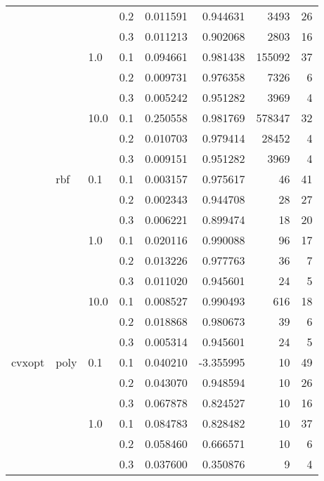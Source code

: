 \begin{table}[H]
\begin{tabular}{llllrrrr}
       &     &      & 0.2 &    0.011591 &  0.944631 &    3493 &    26 \\
       &     &      & 0.3 &    0.011213 &  0.902068 &    2803 &    16 \\
       &     & 1.0  & 0.1 &    0.094661 &  0.981438 &  155092 &    37 \\
       &     &      & 0.2 &    0.009731 &  0.976358 &    7326 &     6 \\
       &     &      & 0.3 &    0.005242 &  0.951282 &    3969 &     4 \\
       &     & 10.0 & 0.1 &    0.250558 &  0.981769 &  578347 &    32 \\
       &     &      & 0.2 &    0.010703 &  0.979414 &   28452 &     4 \\
       &     &      & 0.3 &    0.009151 &  0.951282 &    3969 &     4 \\
       & rbf & 0.1  & 0.1 &    0.003157 &  0.975617 &      46 &    41 \\
       &     &      & 0.2 &    0.002343 &  0.944708 &      28 &    27 \\
       &     &      & 0.3 &    0.006221 &  0.899474 &      18 &    20 \\
       &     & 1.0  & 0.1 &    0.020116 &  0.990088 &      96 &    17 \\
       &     &      & 0.2 &    0.013226 &  0.977763 &      36 &     7 \\
       &     &      & 0.3 &    0.011020 &  0.945601 &      24 &     5 \\
       &     & 10.0 & 0.1 &    0.008527 &  0.990493 &     616 &    18 \\
       &     &      & 0.2 &    0.018868 &  0.980673 &      39 &     6 \\
       &     &      & 0.3 &    0.005314 &  0.945601 &      24 &     5 \\
cvxopt & poly & 0.1  & 0.1 &    0.040210 & -3.355995 &      10 &    49 \\
       &     &      & 0.2 &    0.043070 &  0.948594 &      10 &    26 \\
       &     &      & 0.3 &    0.067878 &  0.824527 &      10 &    16 \\
       &     & 1.0  & 0.1 &    0.084783 &  0.828482 &      10 &    37 \\
       &     &      & 0.2 &    0.058460 &  0.666571 &      10 &     6 \\
       &     &      & 0.3 &    0.037600 &  0.350876 &       9 &     4 \\

\end{tabular}
\end{table}
